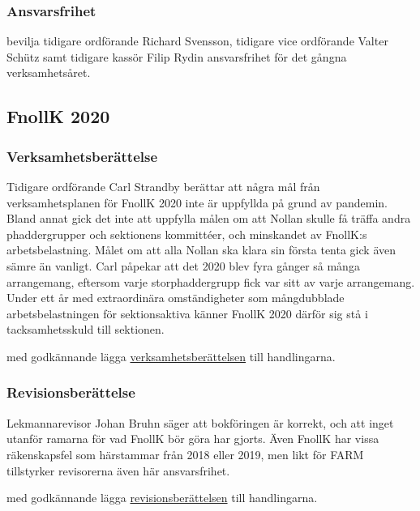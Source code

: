 \documentclass[hidelinks]{sektionsmote}
\begin{document}
\subsubsection{Ansvarsfrihet}
\begin{beslut}
  \item bevilja tidigare ordförande Richard Svensson, tidigare vice ordförande Valter Schütz samt tidigare kassör Filip Rydin ansvarsfrihet för det gångna verksamhetsåret.
\end{beslut}


\subsection{FnollK 2020}
\subsubsection{Verksamhetsberättelse}
Tidigare ordförande Carl Strandby berättar att några mål från verksamhetsplanen för FnollK 2020 inte är uppfyllda på grund av pandemin.
Bland annat gick det inte att uppfylla målen om att Nollan skulle få träffa andra phaddergrupper och sektionens kommittéer, och minskandet av FnollK:s arbetsbelastning.
Målet om att alla Nollan ska klara sin första tenta gick även sämre än vanligt.
Carl påpekar att det 2020 blev fyra gånger så många arrangemang, eftersom varje storphaddergrupp fick var sitt av varje arrangemang.
Under ett år med extraordinära omständigheter som mångdubblade arbetsbelastningen för sektionsaktiva känner FnollK 2020 därför sig stå i tacksamhetsskuld till sektionen.

\begin{beslut}
  \item med godkännande lägga \hyperlink{bilagor/fnollk/vb.pdf.1}{verksamhetsberättelsen} till handlingarna.
\end{beslut}


\subsubsection{Revisionsberättelse}
Lekmannarevisor Johan Bruhn säger att bokföringen är korrekt, och att inget utanför ramarna för vad FnollK bör göra har gjorts.
Även FnollK har vissa räkenskapsfel som härstammar från 2018 eller 2019, men likt för FARM tillstyrker revisorerna även här ansvarsfrihet.

\begin{beslut}
  \item med godkännande lägga \hyperlink{bilagor/fnollk/rb.pdf.1}{revisionsberättelsen} till handlingarna.
\end{beslut}
\end{document}
